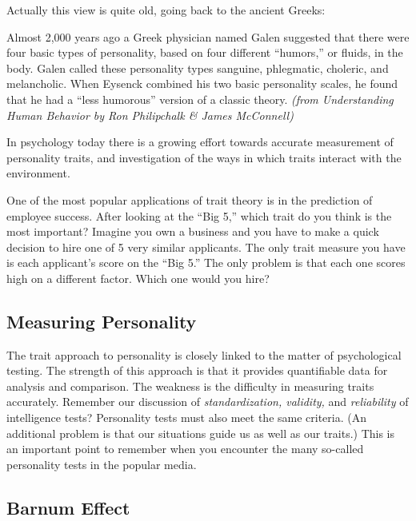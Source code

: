 \documentclass[
]{book}
\begin{document}
Actually this view is quite old, going back to the ancient Greeks:

Almost 2,000 years ago a Greek physician named Galen suggested that there were four basic types of personality, based on four different ``humors,'' or fluids, in the body. Galen called these personality types sanguine, phlegmatic, choleric, and melancholic. When Eysenck combined his two basic personality scales, he found that he had a ``less humorous'' version of a classic theory. \emph{(from Understanding Human Behavior by Ron Philipchalk \& James McConnell)}

In psychology today there is a growing effort towards accurate measurement of personality traits, and investigation of the ways in which traits interact with the environment.

One of the most popular applications of trait theory is in the prediction of employee success. After looking at the ``Big 5,'' which trait do you think is the most important? Imagine you own a business and you have to make a quick decision to hire one of 5 very similar applicants. The only trait measure you have is each applicant's score on the ``Big 5.'' The only problem is that each one scores high on a different factor. Which one would you hire?

\hypertarget{measuring-personality}{%
\subsection*{Measuring Personality}\label{measuring-personality}}

The trait approach to personality is closely linked to the matter of psychological testing. The strength of this approach is that it provides quantifiable data for analysis and comparison. The weakness is the difficulty in measuring traits accurately. Remember our discussion of \emph{standardization, validity,} and \emph{reliability} of intelligence tests? Personality tests must also meet the same criteria. (An additional problem is that our situations guide us as well as our traits.) This is an important point to remember when you encounter the many so-called personality tests in the popular media.

\hypertarget{barnum-effect}{%
\subsection*{Barnum Effect}\label{barnum-effect}}
\end{document}
